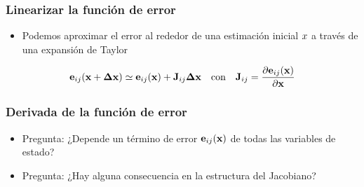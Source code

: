 \begin{frame}
    \frametitle{Linearizar la función de error}
    
    \begin{itemize}
        \item Podemos aproximar el error al rededor de una estimación inicial $x$ a través de una expansión de Taylor
    \end{itemize}

    \begin{equation*}
        \boldsymbol{\mathbf{e}}_{ij}(\boldsymbol{\mathbf{x}} + \boldsymbol{\mathbf{\Delta}}\boldsymbol{\mathbf{x}}) \simeq  \boldsymbol{\mathbf{e}}_{ij}(\boldsymbol{\mathbf{x}}) + \boldsymbol{\mathbf{J}}_{ij}\boldsymbol{\mathbf{\Delta}}\boldsymbol{\mathbf{x}} \quad \text{con} \quad \boldsymbol{\mathbf{J}}_{ij} = \dfrac{\partial\boldsymbol{\mathbf{e}}_{ij}(\boldsymbol{\mathbf{x}})}{\partial\boldsymbol{\mathbf{x}}}
    \end{equation*}
    
\end{frame}

\begin{frame}
    \frametitle{Derivada de la función de error}
    \begin{itemize}
        \item<1-> Pregunta: ¿Depende un término de error $\boldsymbol{\mathbf{e}}_{ij}(\boldsymbol{\mathbf{x}})$ de todas las variables de estado?
        
        
        \item<3-> Pregunta: ¿Hay alguna consecuencia en la estructura del Jacobiano?
        
        
        
    \end{itemize}
    
\end{frame}


